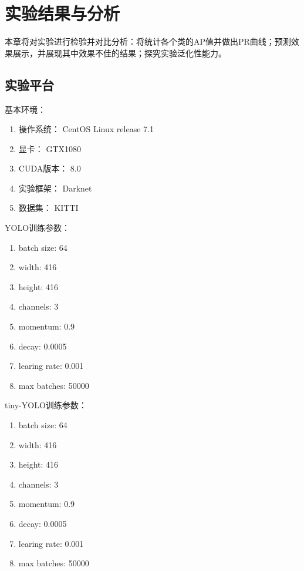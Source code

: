 \chapter{实验结果与分析}
本章将对实验进行检验并对比分析：将统计各个类的AP值并做出PR曲线；预测效果展示，并展现其中效果不佳的结果；探究实验泛化性能力。
\section{实验平台}{
	基本环境：
	\begin{enumerate}
		\item 操作系统： CentOS Linux release 7.1
		\item 显卡： GTX1080
		\item CUDA版本： 8.0
		\item 实验框架： Darknet
		\item 数据集： KITTI
	\end{enumerate}

	YOLO训练参数：
	\begin{enumerate}
		\item batch size: 64
		\item width: 416
		\item height: 416
		\item channels: 3
		\item momentum: 0.9
		\item decay: 0.0005
		\item learing rate: 0.001
		\item max batches: 50000
	\end{enumerate}

	tiny-YOLO训练参数：
	\begin{enumerate}
		\item batch size: 64
		\item width: 416
		\item height: 416
		\item channels: 3
		\item momentum: 0.9
		\item decay: 0.0005
		\item learing rate: 0.001
		\item max batches: 50000
	\end{enumerate}
}


